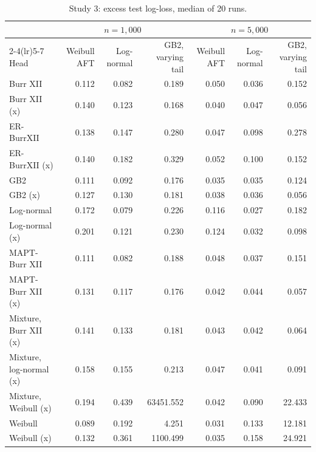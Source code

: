 \begin{table}[htbp]
\centering
\caption{Study 3: excess test log-loss, median of 20 runs.}\label{stab:network_ll}
\scriptsize
\begin{tabular}{lrrrrrr}
\toprule
& \multicolumn{3}{c}{$n = 1{,}000$} & \multicolumn{3}{c}{$n = 5{,}000$} \\
\cmidrule(lr){2-4}\cmidrule(lr){5-7}
Head & Weibull AFT & Log-normal & GB2, varying tail & Weibull AFT & Log-normal & GB2, varying tail \\
\midrule
Burr XII & 0.112 & 0.082 & 0.189 & 0.050 & 0.036 & 0.152 \\
Burr XII (x) & 0.140 & 0.123 & 0.168 & 0.040 & 0.047 & 0.056 \\
ER-BurrXII & 0.138 & 0.147 & 0.280 & 0.047 & 0.098 & 0.278 \\
ER-BurrXII (x) & 0.140 & 0.182 & 0.329 & 0.052 & 0.100 & 0.152 \\
GB2 & 0.111 & 0.092 & 0.176 & 0.035 & 0.035 & 0.124 \\
GB2 (x) & 0.127 & 0.130 & 0.181 & 0.038 & 0.036 & 0.056 \\
Log-normal & 0.172 & 0.079 & 0.226 & 0.116 & 0.027 & 0.182 \\
Log-normal (x) & 0.201 & 0.121 & 0.230 & 0.124 & 0.032 & 0.098 \\
MAPT-Burr XII & 0.111 & 0.082 & 0.188 & 0.048 & 0.037 & 0.151 \\
MAPT-Burr XII (x) & 0.131 & 0.117 & 0.176 & 0.042 & 0.044 & 0.057 \\
Mixture, Burr XII (x) & 0.141 & 0.133 & 0.181 & 0.043 & 0.042 & 0.064 \\
Mixture, log-normal (x) & 0.158 & 0.155 & 0.213 & 0.047 & 0.041 & 0.091 \\
Mixture, Weibull (x) & 0.194 & 0.439 & 63451.552 & 0.042 & 0.090 & 22.433 \\
Weibull & 0.089 & 0.192 & 4.251 & 0.031 & 0.133 & 12.181 \\
Weibull (x) & 0.132 & 0.361 & 1100.499 & 0.035 & 0.158 & 24.921 \\
\bottomrule
\end{tabular}

\par\vspace{0.3em}{\footnotesize (x): shape parameters predicted per patient.}
\end{table}
